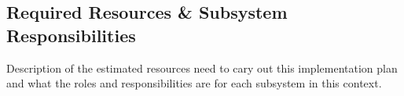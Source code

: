 \subsection{Required Resources \& Subsystem Responsibilities}

Description of the estimated resources need to cary out this implementation plan and what the roles and responsibilities are for each subsystem in this context.